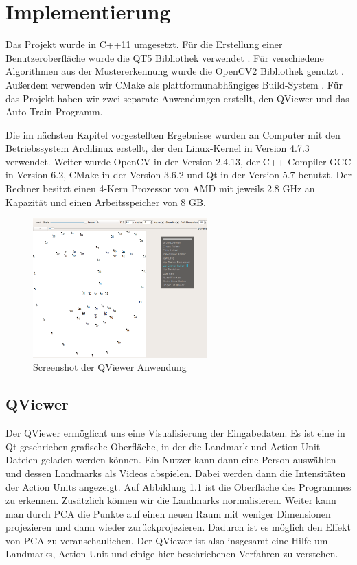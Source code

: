 \chapter{Implementierung}\label{ch:implementierung}
Das Projekt wurde in C++11 umgesetzt. Für die Erstellung einer Benutzeroberfläche wurde die QT5 Bibliothek verwendet \cite{qt5}.
Für verschiedene Algorithmen aus der Mustererkennung wurde die OpenCV2 Bibliothek genutzt \cite{opencv}. Außerdem verwenden wir CMake
als plattformunabhängiges Build-System \cite{cmake}. Für das Projekt haben wir zwei separate Anwendungen erstellt, den QViewer und das Auto-Train
Programm.

Die im nächsten Kapitel vorgestellten Ergebnisse wurden an Computer mit den Betriebssystem Archlinux erstellt, der den Linux-Kernel in Version 4.7.3 verwendet. Weiter wurde OpenCV in der Version 2.4.13, der C++ Compiler GCC in Version 6.2, CMake in der Version 3.6.2 und Qt in der Version 5.7 benutzt. Der Rechner besitzt einen 4-Kern Prozessor von AMD mit jeweils 2.8 GHz an Kapazität und einen Arbeitsspeicher von 8 GB. 
\begin{figure}[ht]
\begin{center}
\includegraphics[width=0.6\textwidth]{qviewer.png}
\caption{Screenshot der QViewer Anwendung}
\end{center}
\label{Implementierung.QViewer}
\end{figure}
\section{QViewer}
Der QViewer ermöglicht uns eine Visualisierung der Eingabedaten.
Es ist eine in Qt geschrieben grafische Oberfläche, in der
die Landmark und Action Unit Dateien geladen werden können. 
Ein Nutzer kann dann eine Person auswählen und dessen Landmarks als Videos abspielen.
Dabei werden dann die Intensitäten der Action Units angezeigt. Auf Abbildung \ref{Implementierung.QViewer} ist die Oberfläche des Programmes zu erkennen.
Zusätzlich können wir die Landmarks normalisieren. Weiter kann man durch PCA die Punkte auf einen neuen Raum mit weniger Dimensionen projezieren und dann wieder zurückprojezieren. Dadurch ist es möglich den Effekt von PCA zu veranschaulichen.
Der QViewer ist also insgesamt eine Hilfe um Landmarks, Action-Unit und einige hier beschriebenen Verfahren zu verstehen.



